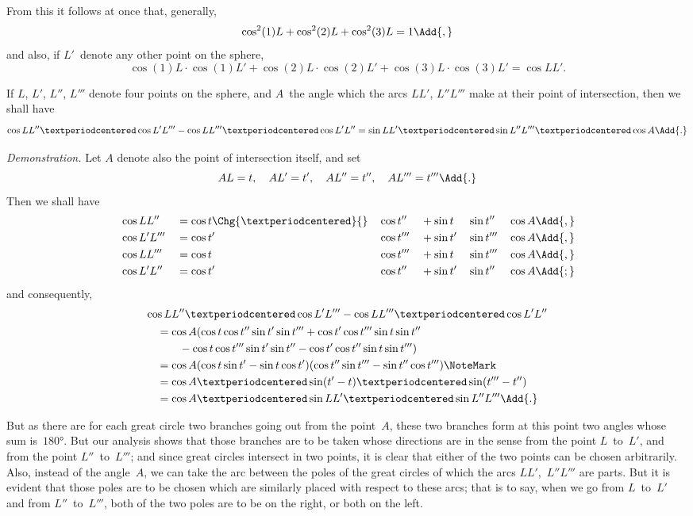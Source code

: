 From this it follows at once that, generally,
\[
\cos^{2}(1)L + \cos^{2}(2)L + \cos^{2}(3)L = 1\Add{,}
\]
and also, if $L'$~denote any other point on the sphere,
\[
\cos(1)L·\cos(1)L' + \cos(2)L·\cos(2)L' + \cos(3)L·\cos(3)L'
  = \cos LL'.
\]

 \begin{Theorem}
If $L$, $L'$, $L''$, $L'''$ denote four points on the sphere, and $A$~the angle
which the arcs $LL'$, $L''L'''$ make at their point of intersection, then we shall have
\[
\cos LL''·\cos L'L''' - \cos LL'''·\cos L'L''
  = \sin LL'·\sin L''L'''·\cos A\Add{.}
\]
\end{Theorem}

\textit{Demonstration.} Let $A$ denote also the point of intersection itself, and set
\[
AL = t,\quad AL' = t',\quad AL'' = t'',\quad AL''' = t'''\Add{.}
\]
Then we shall have
\begin{alignat*}{7}
&\cos L L''  &&= \cos t\Chg{·}{}&& \cos t''  &&+ \sin t  && \sin t''  && \cos A\Add{,} \\
&\cos L'L''' &&= \cos t' && \cos t''' &&+ \sin t' && \sin t''' && \cos A\Add{,} \\
&\cos L L''' &&= \cos t  && \cos t''' &&+ \sin t  && \sin t''' && \cos A\Add{,} \\
&\cos L'L''  &&= \cos t' && \cos t''  &&+ \sin t' && \sin t''  && \cos A\Add{;}
\end{alignat*}
and consequently,
\begin{multline*}
\cos LL''·\cos L'L''' - \cos LL'''·\cos L'L'' \\
\begin{aligned}
&= \cos A (\cos t  \cos t''  \sin t' \sin t'''
         + \cos t' \cos t''' \sin t  \sin t'' \\
&\qquad  - \cos t  \cos t''' \sin t' \sin t''
         - \cos t' \cos t''  \sin t  \sin t''') \\
&= \cos A (\cos t   \sin t'   - \sin t   \cos t')
          (\cos t'' \sin t''' - \sin t'' \cos t''')\NoteMark \\
&= \cos A·\sin (t' - t)·\sin (t''' - t'') \\
&= \cos A·\sin LL'·\sin L''L'''\Add{.}
\end{aligned}
\end{multline*}

But as there are for each great circle two branches going out from the point~$A$,
these two branches form at this point two angles whose sum is~$180°$. But our analysis
shows that those branches are to be taken whose directions are in the sense from the
point $L$~to~$L'$, and from the point $L''$~to~$L'''$; and since great circles intersect in two
points, it is clear that either of the two points can be chosen arbitrarily. Also, instead
of the angle~$A$, we can take the arc between the poles of the great circles of which the
arcs $LL'$,~$L''L'''$ are parts. But it is evident that those poles are to be chosen which
are similarly placed with respect to these arcs; that is to say, when we go from $L$~to~$L'$
and from $L''$~to~$L'''$, both of the two poles are to be on the right, or both on the left.

